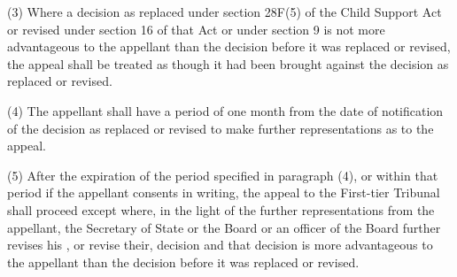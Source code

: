 \documentclass[12pt,a4paper]{article}
\begin{document}
(3) Where a decision as 
replaced under section 28F(5) of the Child Support Act or revised under section 16 of that Act  %
or under section 9 is not more advantageous to the appellant than the decision before it was 
replaced or  %
revised, the appeal shall be treated as though it had been brought against the decision as 
replaced or  %
revised.

(4) The appellant shall have a period of one month from the date of notification of the decision as 
replaced or  %
revised to make further representations as to the appeal.

(5) After the expiration of the period specified in paragraph (4), or within that period if the appellant consents in writing, the appeal to the 
First-tier Tribunal  %
shall proceed except where, in the light of the further representations from the appellant, the Secretary of State
or the Board or an officer of the Board  %
further revises his%
, or revise their,  %
decision and that decision is more advantageous to the appellant than the decision before it was 
replaced or  %
revised.

\end{document}
